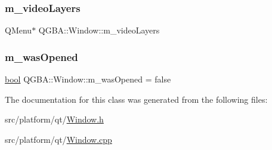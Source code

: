\mbox{\label{class_q_g_b_a_1_1_window_a06d96a244f6d47f78774c88eb6fa3189}} 
\subsubsection{\texorpdfstring{m\+\_\+video\+Layers}{m\_videoLayers}}
{\footnotesize\ttfamily Q\+Menu$\ast$ Q\+G\+B\+A\+::\+Window\+::m\+\_\+video\+Layers\hspace{0.3cm}{\ttfamily [private]}}

\mbox{\label{class_q_g_b_a_1_1_window_a23c19613ffd9ef874abf68a83417004d}} 
\subsubsection{\texorpdfstring{m\+\_\+was\+Opened}{m\_wasOpened}}
{\footnotesize\ttfamily \mbox{\hyperlink{libretro_8h_a4a26dcae73fb7e1528214a068aca317e}{bool}} Q\+G\+B\+A\+::\+Window\+::m\+\_\+was\+Opened = false\hspace{0.3cm}{\ttfamily [private]}}



The documentation for this class was generated from the following files\+:\begin{DoxyCompactItemize}
\item 
src/platform/qt/\mbox{\hyperlink{_window_8h}{Window.\+h}}\item 
src/platform/qt/\mbox{\hyperlink{_window_8cpp}{Window.\+cpp}}\end{DoxyCompactItemize}
